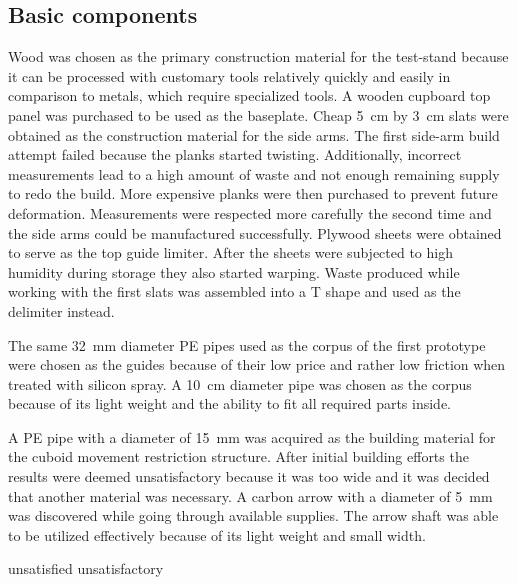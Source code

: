 \subsection{Basic components}
Wood was chosen as the primary construction material for the test-stand because it can be processed with customary tools relatively quickly and easily in comparison to metals, which require specialized tools. A wooden cupboard top panel was purchased to be used as the baseplate. Cheap \SI{5}{\centi\meter} by \SI{3}{\centi\meter} slats were obtained as the construction material for the side arms. The first side-arm build attempt failed because the planks started twisting. Additionally, incorrect measurements lead to a high amount of waste and not enough remaining supply to redo the build. More expensive planks were then purchased to prevent future deformation. Measurements were respected more carefully the second time and the side arms could be manufactured successfully. Plywood sheets were obtained to serve as the top guide limiter. After the sheets were subjected to high humidity during storage they also started warping. Waste produced while working with the first slats was assembled into a T shape and used as the delimiter instead.

The same \SI{32}{\milli\meter} diameter PE pipes used as the corpus of the first prototype were chosen as the guides because of their low price and rather low friction when treated with silicon spray. A \SI{10}{\centi\meter} diameter pipe was chosen as the corpus because of its light weight and the ability to fit all required parts inside. 

A PE pipe with a diameter of \SI{15}{\milli\meter} was acquired as the building material for the cuboid movement restriction structure. After initial building efforts the results were deemed unsatisfactory because it was too wide and it was decided that another material was necessary. A carbon arrow with a diameter of \SI{5}{\milli\meter} was discovered while going through available supplies. The arrow shaft was able to be utilized effectively because of its light weight and small width.

unsatisfied 
unsatisfactory 


